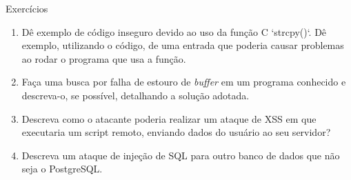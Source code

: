 

  





\begin{frame}{Exercícios}

  \begin{enumerate}
    \item Dê exemplo de código inseguro devido ao uso da função C `strcpy()`.
    Dê exemplo, utilizando o código, de uma entrada que poderia causar
    problemas ao rodar o programa que usa a função.

  \item Faça uma busca por falha de estouro de {\it buffer\/} em um programa conhecido
  e descreva-o, se possível, detalhando a solução adotada.

\item Descreva como o atacante poderia realizar um ataque de XSS em que
  executaria um script remoto, enviando dados do usuário ao seu
  servidor?

\item Descreva um ataque de injeção de SQL para outro banco de dados
  que não seja o PostgreSQL.
\end{enumerate}

\end{frame}